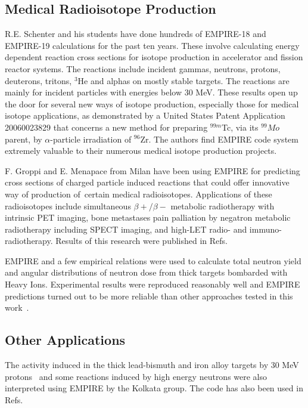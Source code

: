 \documentclass[twocolumn,amsmath,amssymb,10pt,groupedaddress,a4paper]{revtex4}
\begin{document}
\subsection{Medical Radioisotope Production}
R.E. Schenter and his students have done hundreds of EMPIRE-18 and EMPIRE-19 calculations for the past ten years.  These involve calculating energy dependent reaction cross sections for isotope production in accelerator and fission reactor systems.   The reactions include incident gammas, neutrons, protons, deuterons, tritons, $^3$He and alphas on mostly stable targets. The reactions are mainly for incident particles with energies below 30 MeV.  These results open up the door for several new ways of isotope production, especially those for medical isotope applications, as demonstrated by a United States Patent Application 20060023829 that concerns a new method for preparing $^{99m}$Tc, via its $^{99}Mo$ parent, by $\alpha$-particle irradiation of $^{96}$Zr. The authors find EMPIRE code system extremely valuable to their numerous medical isotope  production projects.

F. Groppi and E. Menapace from Milan have been using EMPIRE for predicting cross sections of charged particle induced reactions that could offer innovative way of production of certain medical radioisotopes. Applications of these radioisotopes include simultaneous $\beta+/\beta-$ metabolic radiotherapy with intrinsic PET imaging,  bone metastases pain palliation by negatron metabolic radiotherapy including SPECT imaging,  and high-LET radio- and immuno-radiotherapy. Results of this research were published in Refs.~\cite{Menapace:04, Menapace:05, Groppi:05, Groppi:05a, Groppi:06, Alfassi:06, Persico:06}

EMPIRE and a few empirical relations were used to calculate total neutron yield and angular distributions of neutron dose from thick targets bombarded with Heavy Ions. Experimental results were reproduced reasonably well and EMPIRE predictions turned out to be more reliable than other approaches tested in this work~\cite{Nandy:07}.


\subsection{Other Applications}
The  activity induced in the thick lead-bismuth and iron alloy targets by 30 MeV protons~\cite{Nandy:07a} and some reactions induced by high energy neutrons were also interpreted using EMPIRE by the Kolkata group. The code  has also been used in Refs.~\cite{Said:06, Elmaghraby:06, Pandey:07}
\end{document}
